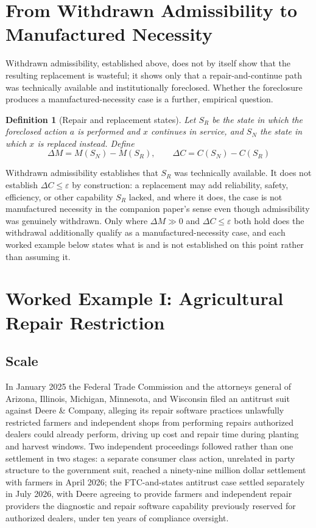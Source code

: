 \documentclass[11pt]{article}
\newtheorem{definition}{Definition}[section]
\begin{document}
\section{From Withdrawn Admissibility to Manufactured Necessity}

Withdrawn admissibility, established above, does not by itself show that the resulting replacement is wasteful; it shows only that a repair-and-continue path was technically available and institutionally foreclosed. Whether the foreclosure produces a manufactured-necessity case is a further, empirical question.

\begin{definition}[Repair and replacement states]
Let $S_R$ be the state in which the foreclosed action $a$ is performed and $x$ continues in service, and $S_N$ the state in which $x$ is replaced instead. Define
\[
\Delta M = M(S_N) - M(S_R), \qquad \Delta C = C(S_N) - C(S_R)
\]
\end{definition}

Withdrawn admissibility establishes that $S_R$ was technically available. It does not establish $\Delta C \leq \varepsilon$ by construction: a replacement may add reliability, safety, efficiency, or other capability $S_R$ lacked, and where it does, the case is not manufactured necessity in the companion paper's sense even though admissibility was genuinely withdrawn. Only where $\Delta M \gg 0$ and $\Delta C \leq \varepsilon$ both hold does the withdrawal additionally qualify as a manufactured-necessity case, and each worked example below states what is and is not established on this point rather than assuming it.

\section{Worked Example I: Agricultural Repair Restriction}

\subsection{Scale}

In January 2025 the Federal Trade Commission and the attorneys general of Arizona, Illinois, Michigan, Minnesota, and Wisconsin filed an antitrust suit against Deere \& Company, alleging its repair software practices unlawfully restricted farmers and independent shops from performing repairs authorized dealers could already perform, driving up cost and repair time during planting and harvest windows. Two independent proceedings followed rather than one settlement in two stages: a separate consumer class action, unrelated in party structure to the government suit, reached a ninety-nine million dollar settlement with farmers in April 2026; the FTC-and-states antitrust case settled separately in July 2026, with Deere agreeing to provide farmers and independent repair providers the diagnostic and repair software capability previously reserved for authorized dealers, under ten years of compliance oversight.
\end{document}
